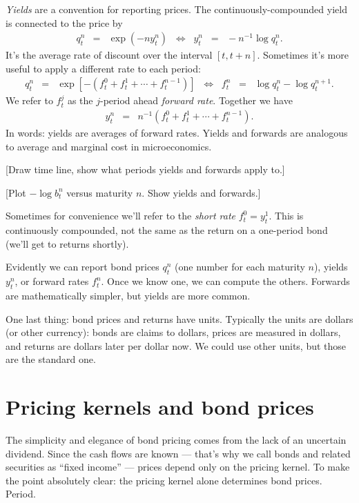 \documentclass[11pt]{article}
\begin{document}
{\it Yields\/} are a convention for reporting prices.
The continuously-compounded yield is connected to the price by
\begin{eqnarray}
    q^n_t &=&  \exp(- n y^n_t)
        \;\;\Leftrightarrow\;\;
        y^n_t \;\;=\;\; - n^{-1} \log q^n_t .
        \label{eq:yields}
\end{eqnarray}
It's the average rate of discount over the interval $[t, t+n]$.
Sometimes it's more useful to apply a different
rate to each period:
\begin{eqnarray}
    q^n_t &=&  \exp[- (f^0_t + f^1_t + \cdots + f^{n-1}_t)]
        \;\;\Leftrightarrow\;\;
        f^n_t \;\;=\;\;  \log q^n_t - \log q^{n+1}_t .
        \label{eq:forwards}
\end{eqnarray}
We refer to $f^j_t$ as the $j$-period ahead {\it forward rate\/}.
Together we have
\begin{eqnarray*}
    y^n_t &=&  n^{-1} \left( f^0_t + f^1_t + \cdots + f^{n-1}_t \right).
\end{eqnarray*}
In words:  yields are averages of forward rates.
Yields and forwards are analogous to average and marginal cost in microeconomics.

[Draw time line, show what periods yields and forwards apply to.]

[Plot $-\log b^n_t$ versus maturity $n$.  Show yields and forwards.]

Sometimes for convenience we'll refer to the {\it short rate\/}
$f^0_t = y^1_t$.
This is continuously compounded, not the same as the return on
a one-period bond (we'll get to returns shortly).

Evidently we can report bond prices $q^n_t$ (one number for each maturity $n$),
yields $y^n_t$, or forward rates $f^n_t$.
Once we know one, we can compute the others.
Forwards are mathematically simpler, but yields are more common.

One last thing:  bond prices and returns have units.
Typically the units are dollars (or other currency):
bonds are claims to dollars, prices are measured in dollars,
and returns are dollars later per dollar now.
We could use other units, but those are the standard one.


\section{Pricing kernels and bond prices}

The simplicity and elegance of bond pricing comes
from the lack of an uncertain dividend.
Since the cash flows are known ---
that's why we call bonds and related securities as ``fixed income'' ---
prices depend only on the pricing kernel.
To make the point absolutely clear:  the pricing kernel alone determines
bond prices.  Period.
\end{document}
